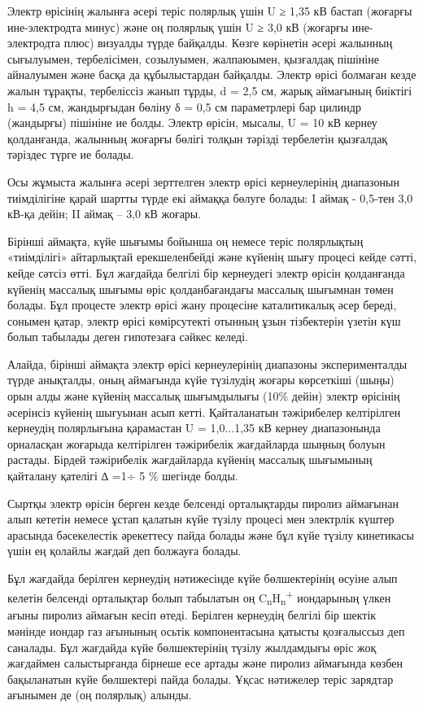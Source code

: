 Электр өрісінің жалынға әсері теріс полярлық үшін U ≥ 1,35 кВ бастап
(жоғарғы ине-электродта минус) және оң полярлық үшін U ≥ 3,0 кВ (жоғарғы
ине-электродта плюс) визуалды түрде байқалды. Көзге көрінетін әсері
жалынның сығылуымен, тербелісімен, созылуымен, жалпаюымен, қызғалдақ
пішініне айналуымен және басқа да құбылыстардан байқалды. Электр өрісі
болмаған кезде жалын тұрақты, тербеліссіз жанып тұрды, d = 2,5 см, жарық
аймағының биіктігі h = 4,5 см, жандырғыдан бөліну δ = 0,5 см
параметрлері бар цилиндр (жандырғы) пішініне ие болды. Электр өрісін,
мысалы, U = 10 кВ кернеу қолданғанда, жалынның жоғарғы бөлігі толқын
тәрізді тербелетін қызғалдақ тәріздес түрге ие болады.

Осы жұмыста жалынға әсері зерттелген электр өрісі кернеулерінің
диапазонын тиімділігіне қарай шартты түрде екі аймаққа бөлуге болады: I
аймақ - 0,5-тен 3,0 кВ-қа дейін; II аймақ -- 3,0 кВ жоғары.

Бірінші аймақта, күйе шығымы бойынша оң немесе теріс полярлықтың
«тиімділігі» айтарлықтай ерекшеленбейді және күйенің шығу процесі кейде
сәтті, кейде сәтсіз өтті. Бұл жағдайда белгілі бір кернеудегі электр
өрісін қолданғанда күйенің массалық шығымы өріс қолданбағандағы массалық
шығымнан төмен болады. Бұл процесте электр өрісі жану процесіне
каталитикалық әсер береді, сонымен қатар, электр өрісі көмірсутекті
отынның ұзын тізбектерін үзетін күш болып табылады деген гипотезаға
сәйкес келеді.

Алайда, бірінші аймақта электр өрісі кернеулерінің диапазоны
эксперименталды түрде анықталды, оның аймағында күйе түзілудің жоғары
көрсеткіші (шыңы) орын алды және күйенің массалық шығымдылығы (10\%
дейін) электр өрісінің әсерінсіз күйенің шығуынан асып кетті.
Қайталанатын тәжірибелер келтірілген кернеудің полярлығына қарамастан U
= 1,0...1,35 кВ кернеу диапазонында орналасқан жоғарыда келтірілген
тәжірибелік жағдайларда шыңның болуын растады. Бірдей тәжірибелік
жағдайларда күйенің массалық шығымының қайталану қателігі ∆ =1÷ 5 \%
шегінде болды.

Сыртқы электр өрісін берген кезде белсенді орталықтарды пиролиз
аймағынан алып кететін немесе ұстап қалатын күйе түзілу процесі мен
электрлік күштер арасында бәсекелестік әрекеттесу пайда болады және бұл
күйе түзілу кинетикасы үшін ең қолайлы жағдай деп болжауға болады.

Бұл жағдайда берілген кернеудің нәтижесінде күйе бөлшектерінің өсуіне
алып келетін белсенді орталықтар болып табылатын оң
C\textsubscript{n}H\textsubscript{n}\textsuperscript{+} иондарының үлкен
ағыны пиролиз аймағын кесіп өтеді. Берілген кернеудің белгілі бір шектік
мәнінде иондар газ ағынының осьтік компонентасына қатысты қозғалыссыз
деп саналады. Бұл жағдайда күйе бөлшектерінің түзілу жылдамдығы өріс жоқ
жағдаймен салыстырғанда бірнеше есе артады және пиролиз аймағында көзбен
бақыланатын күйе бөлшектері пайда болады. Ұқсас нәтижелер теріс зарядтар
ағынымен де (оң полярлық) алынды.

